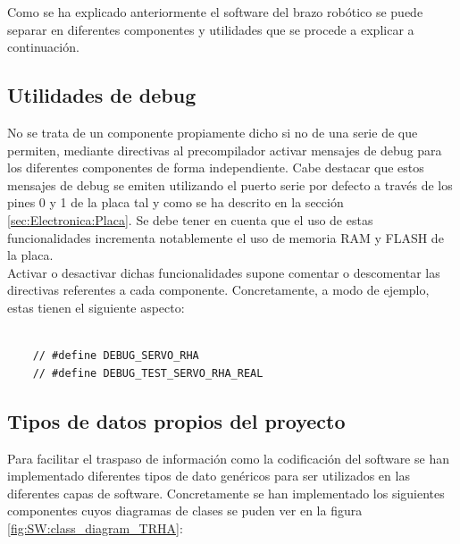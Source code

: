 Como se ha explicado anteriormente el software del brazo robótico se puede separar en diferentes componentes y utilidades que se procede a explicar a continuación.
    \subsection{Utilidades de debug} \label{subsec:SW:debug}
        No se trata de un componente propiamente dicho si no de una serie de  que permiten, mediante directivas al precompilador activar mensajes de debug para los diferentes componentes de forma independiente. Cabe destacar que estos mensajes de debug se emiten utilizando el puerto serie por defecto a través de los pines 0 y 1 de la placa tal y como se ha descrito en la sección \ref{sec:Electronica:Placa}. Se debe tener en cuenta que el uso de estas funcionalidades incrementa notablemente el uso de memoria RAM y FLASH de la placa.
        \\
        Activar o desactivar dichas funcionalidades supone comentar o descomentar las directivas referentes a cada componente.  Concretamente, a modo de ejemplo, estas tienen el siguiente aspecto:
        \lstset{language=C, breaklines=true, basicstyle=\footnotesize}
        \begin{lstlisting}[frame=single]

    // #define DEBUG_SERVO_RHA
    // #define DEBUG_TEST_SERVO_RHA_REAL

        \end{lstlisting}
    \subsection{Tipos de datos propios del proyecto} \label{subsec:SW:rhatypes}
        Para facilitar el traspaso de información como la codificación del software se han implementado diferentes tipos de dato genéricos para ser utilizados en las diferentes capas de software. Concretamente se han implementado los siguientes componentes cuyos diagramas de clases se puden ver en la figura \ref{fig:SW:class_diagram_TRHA}:

